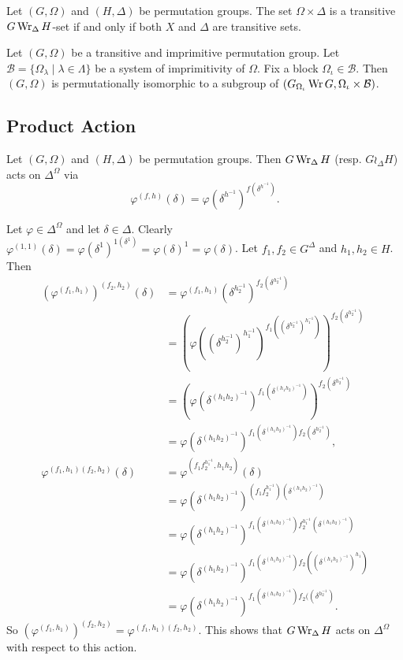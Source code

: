 \begin{proposition}
	Let $(G,\Omega)$ and $(H,\Delta)$ be permutation groups. The set $\Omega\times \Delta$ is a transitive $G\operatorname{Wr}_\Delta H$-set if and only if both $X$ and $\Delta$ are transitive sets.
\end{proposition}

\begin{theorem}
	Let $(G,\Omega)$ be a transitive and imprimitive permutation group. Let $\mathcal{B} = \{\Omega_\lambda\mid \lambda\in\Lambda\}$ be a system of imprimitivity of $\Omega$. Fix a block $\Omega_\iota \in\mathcal{B}$. Then $(G,\Omega)$ is permutationally isomorphic to a subgroup of $(G_{\Omega_\iota} \operatorname{Wr} G, \Omega_\iota\times \mathcal{B})$.
\end{theorem}

\subsection{Product Action}
\begin{proposition} \label{prop-product-action-of-WP}
	Let $(G,\Omega)$ and $(H,\Delta)$ be permutation groups. Then $G\operatorname{Wr}_\Delta H$ (resp. $G\wr_\Delta H$) acts on $\Delta^\Omega$ via
	\begin{equation*}
	\varphi^{(f,h)}(\delta) = \varphi(\delta^{h^{-1}})^{f(\delta^{h^{-1}})}.
	\end{equation*} 
\end{proposition}
\begin{sketch}
	Let $\varphi\in \Delta^{\Omega}$ and let $\delta\in \Delta$. 
	Clearly $\varphi^{(1,1)}(\delta) = \varphi(\delta^{1})^{1(\delta^{1})} = \varphi(\delta)^{1} = \varphi(\delta)$. Let $f_1,f_2\in G^\Delta$ and $h_1,h_2\in H$. Then  
	\begin{align*}
		(\varphi^{(f_1,h_1)})^{(f_2,h_2)}(\delta) &= \varphi^{(f_1,h_1)}(\delta^{h_2^{-1}})^{f_2(\delta^{h_2^{-1}})}
		\\
		&= (\varphi((\delta^{h_2^{-1}})^{h_1^{-1}})^{f_1((\delta^{h_2^{-1}})^{h_1^{-1}})})^{f_2(\delta^{h_2^{-1}})}
		\\
		&= (\varphi(\delta^{(h_1h_2)^{-1}})^{f_1(\delta^{(h_1h_2)^{-1}})})^{f_2(\delta^{h_2^{-1}})}
		\\
		&= \varphi(\delta^{(h_1h_2)^{-1}})^{f_1(\delta^{(h_1h_2)^{-1}})f_2(\delta^{h_2^{-1}})},
		\\
\varphi^{(f_1,h_1)(f_2,h_2)}(\delta)&= \varphi^{(f_1f_2^{h_1^{-1}},h_1h_2)}(\delta)
\\
&= \varphi(\delta^{(h_1h_2)^{-1}})^{(f_1f_2^{h_1^{-1}})(\delta^{(h_1h_2)^{-1}})}
\\
&= \varphi(\delta^{(h_1h_2)^{-1}})^{f_1(\delta^{(h_1h_2)^{-1}})f_2^{h_1^{-1}}(\delta^{(h_1h_2)^{-1}})}
\\
&= \varphi(\delta^{(h_1h_2)^{-1}})^{f_1(\delta^{(h_1h_2)^{-1}})f_2((\delta^{(h_1h_2)^{-1}})^{h_1})}
\\
&= \varphi(\delta^{(h_1h_2)^{-1}})^{f_1(\delta^{(h_1h_2)^{-1}})f_2((\delta^{h_2^{-1}})}.
\end{align*}
	So $(\varphi^{(f_1,h_1)})^{(f_2,h_2)}  =\varphi^{(f_1,h_1)(f_2,h_2)}$. This shows that $G\operatorname{Wr}_{\Delta} H$ acts on $\Delta^\Omega$ with respect to this action.
\end{sketch}
